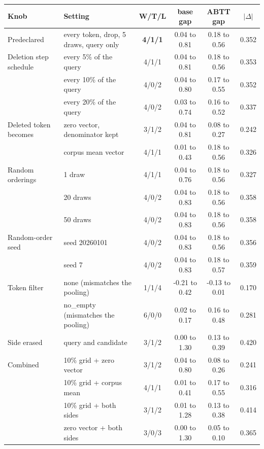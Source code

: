 \begin{table}[t]
\centering
\small
\setlength{\tabcolsep}{5pt}
\begin{tabular}{llcccc}
\toprule
Knob & Setting & W/T/L & base gap & ABTT gap & $|\Delta|$ \\
\midrule
Predeclared & every token, drop, 5 draws, query only & \textbf{4/1/1} & 0.04 to 0.81 & 0.18 to 0.56 & 0.352 \\
\addlinespace[2pt]
Deletion step schedule & every 5\% of the query & 4/1/1 & 0.04 to 0.81 & 0.18 to 0.56 & 0.353 \\
 & every 10\% of the query & 4/0/2 & 0.04 to 0.80 & 0.17 to 0.55 & 0.352 \\
 & every 20\% of the query & 4/0/2 & 0.03 to 0.74 & 0.16 to 0.52 & 0.337 \\
\addlinespace[2pt]
Deleted token becomes & zero vector, denominator kept & 3/1/2 & 0.04 to 0.81 & 0.08 to 0.27 & 0.242 \\
 & corpus mean vector & 4/1/1 & 0.01 to 0.43 & 0.18 to 0.56 & 0.326 \\
\addlinespace[2pt]
Random orderings & 1 draw & 4/1/1 & 0.04 to 0.76 & 0.18 to 0.56 & 0.327 \\
 & 20 draws & 4/0/2 & 0.04 to 0.83 & 0.18 to 0.56 & 0.358 \\
 & 50 draws & 4/0/2 & 0.04 to 0.83 & 0.18 to 0.56 & 0.358 \\
\addlinespace[2pt]
Random-order seed & seed 20260101 & 4/0/2 & 0.04 to 0.83 & 0.18 to 0.56 & 0.356 \\
 & seed 7 & 4/0/2 & 0.04 to 0.83 & 0.18 to 0.57 & 0.359 \\
\addlinespace[2pt]
Token filter & none (mismatches the pooling) & 1/1/4 & -0.21 to 0.42 & -0.13 to 0.01 & 0.170 \\
 & no\_empty (mismatches the pooling) & 6/0/0 & 0.02 to 0.17 & 0.16 to 0.48 & 0.281 \\
\addlinespace[2pt]
Side erased & query and candidate & 3/1/2 & 0.00 to 1.30 & 0.13 to 0.39 & 0.420 \\
\addlinespace[2pt]
Combined & 10\% grid + zero vector & 3/1/2 & 0.04 to 0.80 & 0.08 to 0.26 & 0.241 \\
 & 10\% grid + corpus mean & 4/1/1 & 0.01 to 0.41 & 0.17 to 0.55 & 0.316 \\
 & 10\% grid + both sides & 3/1/2 & 0.01 to 1.28 & 0.13 to 0.38 & 0.414 \\
 & zero vector + both sides & 3/0/3 & 0.00 to 1.30 & 0.05 to 0.10 & 0.365 \\

\end{tabular}
\end{table}
